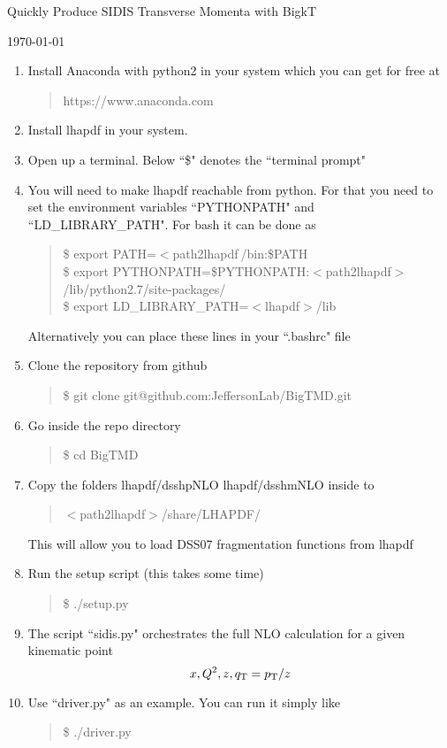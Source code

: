 \documentclass[12pt]{article}
\newcommand{\rquote}[1]{\textcolor{red}{ \begin{quote} #1 \end{quote}}}
\newcommand\3[1]{\boldsymbol{#1}}
\begin{document}
\centerline{Quickly Produce SIDIS Transverse Momenta with BigkT}
\centerline{\today}
\vspace{.25in}
\begin{enumerate}

\item Install Anaconda with python2 in your system which you can get for free at
     \rquote{https://www.anaconda.com}

\item Install lhapdf in your system. 

\item Open up a terminal. Below ``\$" denotes the ``terminal prompt"

\item You will need to make lhapdf reachable from python. For that you need 
      to set the environment variables ``PYTHONPATH" and
      ``LD\_LIBRARY\_PATH". For bash it can be
      done as
      \rquote{
      \$ export PATH=$<$path2lhapdf$\>$/bin:\$PATH \\
      \$ export PYTHONPATH=\$PYTHONPATH:$<$path2lhapdf$>$/lib/python2.7/site-packages/\\
      \$ export LD\_LIBRARY\_PATH=$<$lhapdf$>$/lib \\
      }
      Alternatively you can place these lines in your ``.bashrc" file

\item Clone the repository from github
     \rquote{\$ git clone git@github.com:JeffersonLab/BigTMD.git}

\item Go inside the repo directory
     \rquote{\$ cd BigTMD}

\item Copy the folders lhapdf/dsshpNLO  lhapdf/dsshmNLO inside to 
      \rquote{
      $<$path2lhapdf$>$/share/LHAPDF/
      }
      This will allow you to load DSS07 fragmentation functions from
      lhapdf 

\item Run the setup script (this takes some time)
      \rquote{\$ ./setup.py  }

\item The script ``sidis.py" orchestrates the full NLO calculation 
      for a given kinematic point 
        $$x,Q^2,z,q_{\rm T}=p_{\rm T}/z$$

\item Use ``driver.py" as an example. You can run it simply like 
      \rquote{\$ ./driver.py  }


\end{enumerate}
\end{document}
